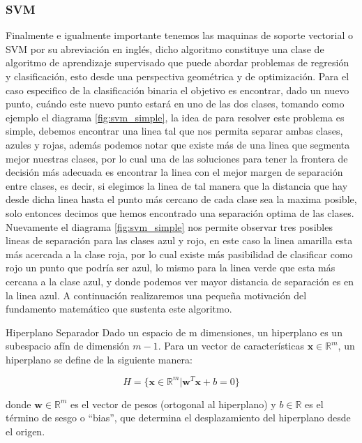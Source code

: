 \subsubsection{SVM}

Finalmente e igualmente importante tenemos las maquinas de soporte vectorial o SVM por su abreviación en inglés, dicho algoritmo constituye una clase de algoritmo de aprendizaje supervisado que puede abordar problemas de regresión y clasificación, esto desde una perspectiva geométrica y de optimización. Para el caso especifico de la clasificación binaria el objetivo es encontrar, dado un nuevo punto, cuándo este nuevo punto estará en uno de las dos clases, tomando como ejemplo el diagrama \ref{fig:svm_simple}, la idea de para resolver este problema es simple, debemos encontrar una linea tal que nos permita separar ambas clases, azules y rojas, además podemos notar que existe más de una linea que segmenta mejor nuestras clases, por lo cual una de las soluciones para tener la frontera de decisión más adecuada es encontrar la linea con el mejor margen de separación entre clases, es decir, si elegimos la linea de tal manera que la distancia que hay desde dicha linea hasta el punto más cercano de cada clase sea la maxima posible, solo entonces decimos que hemos encontrado una separación optima de las clases. Nuevamente el diagrama \ref{fig:svm_simple} nos permite observar tres posibles lineas de separación para las clases azul y rojo, en este caso la linea amarilla esta más acercada a la clase roja, por lo cual existe más pasibilidad de clasificar como rojo un punto que podría ser azul, lo mismo para la linea verde que esta más cercana a la clase azul, y donde podemos ver mayor distancia de separación es en la linea azul. A continuación realizaremos una pequeña motivación del fundamento matemático que sustenta este algoritmo.

\begin{definicion}{Hiperplano Separador}
	Dado un espacio de m dimensiones, un hiperplano es un subespacio afín de dimensión $m-1$. Para un vector de características $\mathbf{x} \in \mathbb{R}^m$, un hiperplano se define de la siguiente manera:
	
	\begin{equation}
		H = \{\mathbf{x}\in \mathbb{R}^m|\mathbf{w}^T \mathbf{x} + b = 0\}
	\end{equation}
	
	donde $\mathbf{w} \in \mathbb{R}^m$ es el vector de pesos (ortogonal al hiperplano) y $b \in \mathbb{R}$ es el término de sesgo o ``bias'', que determina el desplazamiento del hiperplano desde el origen.
\end{definicion}

